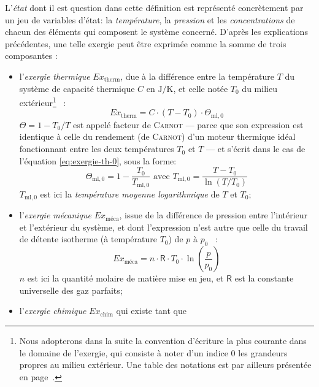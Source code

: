 \documentclass[a4paper,11pt]{scrartcl}
\begin{document}
L'\emph{état} dont il est question dans cette définition est représenté
concrètement par un jeu de variables d'état: la \emph{température}, la
\emph{pression} et les \emph{concentrations} de chacun des éléments qui
composent le système concerné. D'après les explications précédentes, une telle
exergie peut être exprimée comme la somme de trois composantes : \begin{itemize}
	\item l'\emph{exergie thermique} $Ex_{\text{therm}}$, due à la
		différence entre la température $T$ du système de capacité
		thermique $C$ en $\mathrm{J/K}$, et celle notée $T_0$ du milieu
		extérieur\footnote{Nous adopterons dans la suite la
		convention d'écriture la plus courante dans le domaine de
		l'exergie, qui consiste à noter d'un indice $0$ les grandeurs
		propres au milieu extérieur. Une table des notations est par
		ailleurs présentée en
		page~\pageref{table-notations}.}~\cite{entropie-157-0013-0020} :
		\begin{equation}
			Ex_{\text{therm}} = C \cdot (T-T_0) \cdot
			\Theta_{\text{ml},0} \label{eq:exergie-th-0}
		\end{equation} $\Theta=1-T_0/T$ est appelé facteur de
		\textsc{Carnot} --- parce que son expression est identique à
		celle du rendement (de \textsc{Carnot}) d'un moteur thermique
		idéal fonctionnant entre les deux températures $T_0$ et $T$ ---
		et s'écrit dans le cas de l'équation \eqref{eq:exergie-th-0},
		sous la forme: \begin{equation}
			\Theta_{\text{ml},0} = 1 - \frac{T_0}{T_{\text{ml},0}}
			\text{ avec } T_{\text{ml},0} =
			\frac{T-T_0}{\ln(T/T_0)}
		\end{equation} $T_{\text{ml},0}$ est ici la \emph{température
		moyenne logarithmique} de $T$ et $T_0$;
	\item l'\emph{exergie mécanique} $Ex_{\text{méca}}$, issue de la
		différence de pression entre l'intérieur et l'extérieur du
		système, et dont l'expression n'est autre que celle du travail
		de détente isotherme (à température $T_0$) de $p$ à
		$p_0$~\cite{TI-BE8013} : \begin{equation}
			Ex_{\text{méca}} = n \cdot \textsf{R} \cdot T_0 \cdot
			\ln\left( \frac{p}{p_0} \right) \label{eq:exergie-m-0}
		\end{equation} $n$ est ici la quantité molaire de matière mise
		en jeu, et $\mathsf{R}$ est la constante universelle des gaz
		parfaits;
	\item l'\emph{exergie chimique} $Ex_{\text{chim}}$ qui existe tant que

\end{itemize}
\end{document}
